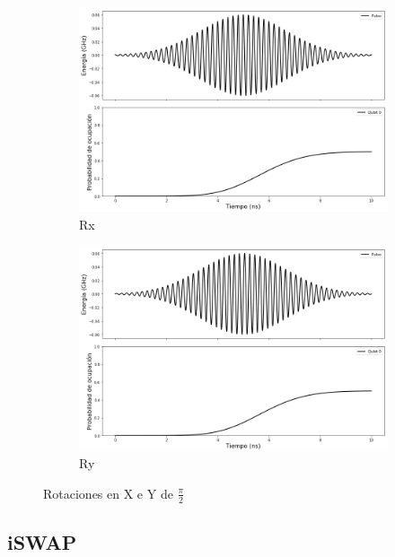 \begin{figure}[H]
    \centering
    \begin{subfigure}[m]{0.49\textwidth}
        \centering \includegraphics[width=1\linewidth]{img/rx0pi2.png}
        \caption{Rx}
    \end{subfigure}
    \begin{subfigure}[m]{0.49\textwidth}
        \centering \includegraphics[width=1\linewidth]{img/ry0pi2.png}
        \caption{Ry}
    \end{subfigure}
    \caption[Rotaciones en X e Y de $\frac{\pi}{2}$]{Rotaciones en X e Y de $\frac{\pi}{2}$}
\label{fig:rxry0pi2}
\end{figure}

\subsection{iSWAP}

